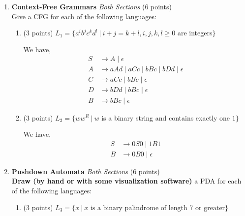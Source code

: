 \documentclass[11pt]{article}
\begin{document}
\begin{enumerate}
\item \textbf{Context-Free Grammars} \textit{Both Sections} (6 points) \\
Give a CFG for each of the following languages:

\begin{enumerate}

\item (3 points) $L_1 = \{a^ib^jc^kd^l\ |\ i+j = k+l, i,j,k,l \geq 0$ are integers$\}$

\begin{answer}
  We have, 
  \begin{align*}
    S &\to A \mid \epsilon\\
    A &\to a A d \mid a C c \mid b B c \mid b D d \mid \epsilon\\
    C & \to a C c \mid b B c \mid \epsilon\\
    D &\to b D d \mid b B c \mid \epsilon\\
    B & \to b B c \mid \epsilon
  \end{align*}
\end{answer}

\item (3 points) $L_2 = \{ ww^R\ |\ w$ is a binary string and contains exactly one $1$$\}$

\begin{answer}
  We have, 
  \begin{align*}
    S &\to 0 S 0 \mid 1 B 1 \\
    B &\to 0B 0 \mid \epsilon
  \end{align*}
\end{answer}

\end{enumerate}


\item \textbf{Pushdown Automata} \textit{Both Sections} (6 points) \\
\textbf{Draw (by hand or with some visualization software)} a PDA for each of the following languages:

\begin{enumerate}
\item (3 points) $L_3 = \{x~|~x \text{ is a binary palindrome of length 7 or greater} \}$


\end{enumerate}
\end{enumerate}
\end{document}
